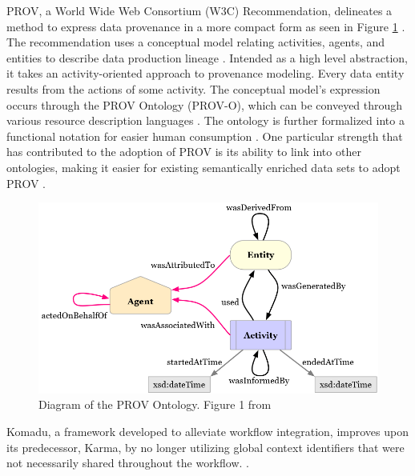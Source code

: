 PROV, a World Wide Web Consortium (W3C) Recommendation, delineates a method to express data provenance in a more compact form as seen in Figure \ref{PROVO} \cite{Gil2013a} \cite{Groth2013}.
The recommendation uses a conceptual model relating activities, agents, and entities to describe data production lineage \cite{Moreau2013c} \cite{Nies2013} \cite{Nies2013a}.
Intended as a high level abstraction, it takes an activity-oriented approach to provenance modeling.
Every data entity results from the actions of some activity.
The conceptual model's expression occurs through the PROV Ontology (PROV-O), which can be conveyed through various resource description languages \cite{Hua2013} \cite{Klyne2013}.
The ontology is further formalized into a functional notation for easier human consumption \cite{Moreau2013b} \cite{Cheney2013a}.
One particular strength that has contributed to the adoption of PROV is its ability to link into other ontologies, making it easier for existing semantically enriched data sets to adopt PROV \cite{Miles2013} \cite{Moreau2013}.
\begin{figure}
	\centering
	\includegraphics[scale=0.5]{figures/ProvO.png}
	\caption[Diagram of the PROV Ontology.]{Diagram of the PROV Ontology.  Figure 1 from \cite{Lebo2013}}
	\label{PROVO}
\end{figure}
Komadu, a framework developed to alleviate workflow integration, improves upon its predecessor, Karma, by no longer utilizing global context identifiers that were not necessarily shared throughout the workflow. \cite{Suriarachchi_2015}.

